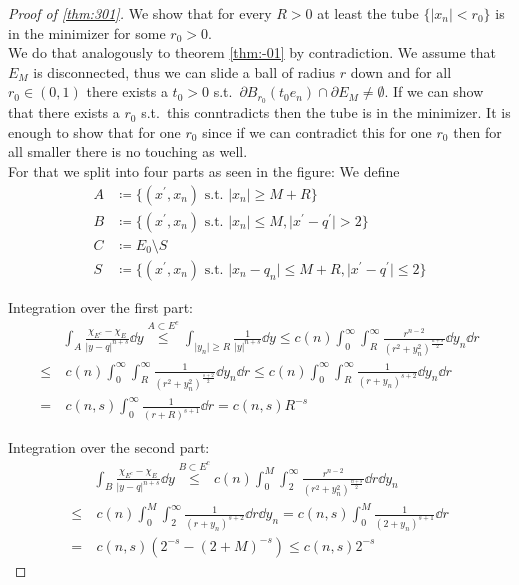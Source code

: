 \begin{proof}[Proof of \cref{thm:301}]
	We show that for every \( R > 0 \) at least the tube \( \{ \lvert x_n \rvert < r_0 \}
	\) is in the minimizer for some \( r_0 > 0 \). \\
	We do that analogously to theorem \cref{thm:-01} by contradiction. We assume that \(
	E_M \) is disconnected, thus we can slide a ball of radius \( r \) down and for all \(
	r_0 \in (0,1) \) there exists a \( t_0 > 0 \) s.t.\ \( \partial B_{r_0}(t_0 e_n) \cap
	\partial E_M \neq \emptyset \). If we can show that there exists a \( r_0 \) s.t.\
	this conntradicts then the tube is in the minimizer. It is enough to show that for one
	\( r_0 \) since if we can contradict this for one \( r_0 \) then for all smaller there
	is no touching as well. \\
	For that we split into four parts as seen in the figure:
	We define
	\begin{align*}
		A & \coloneqq \{(x^\prime,x_n) \text{ s.t. } \lvert x_n \rvert \geq M+R \} \\
		B & \coloneqq \{(x^\prime,x_n) \text{ s.t. } \lvert x_n \rvert \leq M, \lvert x^\prime -q^\prime \rvert > 2 \} \\
		C & \coloneqq E_0 \setminus S \\
		S & \coloneqq \{ (x^\prime,x_n) \text{ s.t. } \lvert x_n - q_n \rvert \leq M+R, \lvert x^\prime -q^\prime \rvert \leq 2\}
	\end{align*}

	Integration over the first part:
	\begin{align*}
		     & \int_A \frac{\chi_{E^c} -\chi_E}{\lvert y-q\rvert^{n+s}} \dd{y} \overset{A \subset E^c}{ \leq} \int_{\lvert y_n \rvert \geq R} \frac{1}{\lvert y \rvert^{n+s}} \dd{y} \leq c(n) \int_0^\infty \int_R^\infty \frac{r^{n-2}}{(r^2 +y_n^2)^{\frac{n+s}{2}}} \dd{y_n} \dd{r} \\
		\leq & \ c(n) \int_0^\infty \int_R^\infty \frac{1}{(r^2 +y_n^2)^{\frac{s+2}{2}}} \dd{y_n} \dd{r} \leq c(n) \int_0^\infty \int_R^\infty \frac{1}{(r+y_n)^{s+2}} \dd{y_n} \dd{r} \\
		=    & \ c(n,s) \int_0^\infty \frac{1}{(r+R)^{s+1}} \dd{r} = c(n,s) R^{-s}
	\end{align*}

	Integration over the second part:
	\begin{align*}
		     & \int_B \frac{\chi_{E^c} -\chi_E}{\lvert y-q\rvert^{n+s}} \dd{y} \overset{B \subset E^c}{ \leq} c(n) \int_0^M \int_2^\infty \frac{r^{n-2}}{(r^2 +y_n^2)^{\frac{n+s}{2}}} \dd{r} \dd{y_n} \\
		\leq & \ c(n) \int_0^M \int_2^\infty \frac{1}{( r+y_n)^{s+2}} \dd{r} \dd{y_n} = c(n,s) \int_0^M \frac{1}{(2+y_n)^{s+1}} \dd{r} \\
		=    & \ c(n,s)(2^{-s}-(2+M)^{-s}) \leq c(n,s) 2^{-s}
	\end{align*}


\end{proof}
